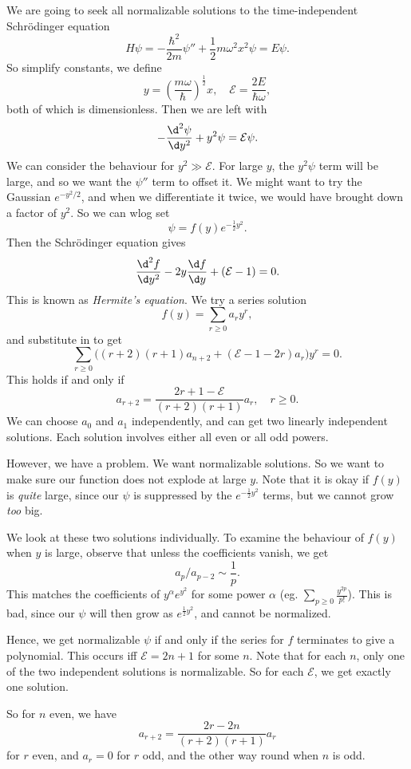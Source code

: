 \documentclass[a4paper]{article}
\begin{document}
We are going to seek all normalizable solutions to the time-independent Schr\"odinger equation
\[
  H\psi = -\frac{\hbar^2}{2m}\psi'' + \frac{1}{2}m\omega^2 x^2 \psi = E\psi.
\]
So simplify constants, we define
\[
  y = \left(\frac{m\omega}{\hbar}\right)^{\frac{1}{2}}x,\quad \mathcal{E} = \frac{2E}{\hbar \omega},
\]
both of which is dimensionless. Then we are left with
\[
  -\frac{\d^2 \psi}{\d y^2} + y^2\psi = \mathcal{E} \psi.
\]
We can consider the behaviour for $y^2 \gg \mathcal{E}$. For large $y$, the $y^2 \psi$ term will be large, and so we want the $\psi''$ term to offset it. We might want to try the Gaussian $e^{-y^2/2}$, and when we differentiate it twice, we would have brought down a factor of $y^2$. So we can wlog set
\[
  \psi = f(y) e^{-\frac{1}{2}y^2}.
\]
Then the Schr\"odinger equation gives
\[
  \frac{\d^2 f}{\d y^2} - 2y\frac{\d f}{\d y} + (\mathcal{E} - 1) = 0.
\]
This is known as \emph{Hermite's equation}. We try a series solution
\[
  f(y) = \sum_{r \geq 0} a_r y^r,
\]
and substitute in to get
\[
  \sum_{r \geq 0} \big( (r + 2)(r + 1)a_{n + 2} + (\mathcal{E} - 1 - 2r)a_r\big) y^r = 0.
\]
This holds if and only if
\[
  a_{r + 2} = \frac{2 r + 1 - \mathcal{E}}{(r + 2)(r + 1)} a_r,\quad r \geq 0.
\]
We can choose $a_0$ and $a_1$ independently, and can get two linearly independent solutions. Each solution involves either all even or all odd powers.

However, we have a problem. We want normalizable solutions. So we want to make sure our function does not explode at large $y$. Note that it is okay if $f(y)$ is \emph{quite} large, since our $\psi$ is suppressed by the $e^{-\frac{1}{2}y^2}$ terms, but we cannot grow \emph{too} big.

We look at these two solutions individually. To examine the behaviour of $f(y)$ when $y$ is large, observe that unless the coefficients vanish, we get
\[
  a_{p}/a_{p - 2} \sim \frac{1}{p}.
\]
This matches the coefficients of $y^\alpha e^{y^2}$ for some power $\alpha$ (eg. $\sum_{p \geq 0} \frac{y^{2p}}{p!}$). This is bad, since our $\psi$ will then grow as $e^{\frac{1}{2}y^2}$, and cannot be normalized.

Hence, we get normalizable $\psi$ if and only if the series for $f$ terminates to give a polynomial. This occurs iff $\mathcal{E} = 2n + 1$ for some $n$. Note that for each $n$, only one of the two independent solutions is normalizable. So for each $\mathcal{E}$, we get exactly one solution.

So for $n$ even, we have
\[
  a_{r + 2} = \frac{2r - 2n}{(r + 2)(r + 1)} a_r
\]
for $r$ even, and $a_r = 0$ for $r$ odd, and the other way round when $n$ is odd.
\end{document}
